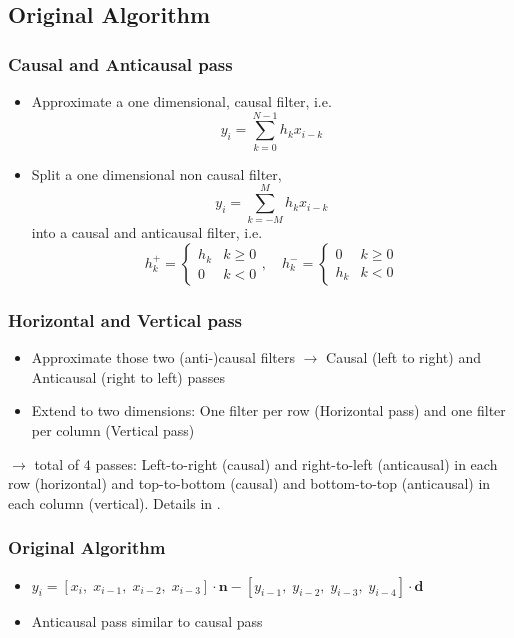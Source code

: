 \documentclass{beamer}
\begin{document}
\subsection{Original Algorithm}
\begin{frame}
\frametitle{Causal and Anticausal pass}

\begin{itemize}
  \item Approximate a one dimensional, causal filter, i.e.
    \begin{equation}
      y_i = \sum_{k = 0}^{N-1} h_k x_{i - k}
    \end{equation}
  \item Split a one dimensional non causal filter,
    \begin{equation}
      y_i = \sum_{k = -M}^{M} h_k x_{i - k}
    \end{equation}
    into a causal and anticausal filter, i.e.
    \begin{equation}
      h^+_k = \begin{cases}
        h_k & k \ge 0 \\
        0 & k < 0
      \end{cases},
      \quad
      h^-_k = \begin{cases}
        0 & k \ge 0 \\
        h_k & k < 0
      \end{cases}
    \end{equation}
      
\end{itemize}
\end{frame}

\begin{frame}
\frametitle{Horizontal and Vertical pass}

\begin{itemize}
  \item Approximate those two (anti-)causal filters $\to$ Causal (left to
    right) and Anticausal (right to left) passes
  \item Extend to two dimensions: One filter per row (Horizontal pass) and
    one filter per column (Vertical pass)
\end{itemize}
  $\to$ total of $4$ passes: Left-to-right (causal) and right-to-left
    (anticausal) in each row (horizontal) and top-to-bottom (causal) and
    bottom-to-top (anticausal) in each column (vertical). Details in
    \cite{deriche}.
\end{frame}

\begin{frame}
\frametitle{Original Algorithm}

    
\begin{itemize}
\item $y_i = [x_i,\;x_{i-1},\;x_{i-2},\;x_{i-3}]\cdot\mathbf{n}
- [y_{i-1},\;y_{i-2},\;y_{i-3},\;y_{i-4}]\cdot\mathbf{d}$ 
\item Anticausal pass similar to causal pass
\end{itemize}
\end{frame}
\end{document}
